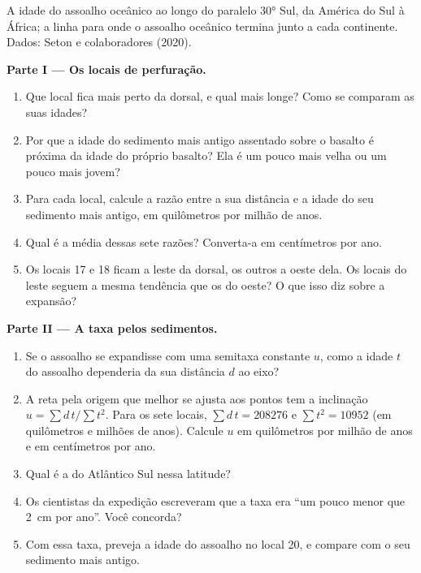 \begin{problem}
\begin{center}
{\small A idade do assoalho oceânico ao longo do paralelo \ang{30} Sul, da
América do Sul à África; a linha para onde o assoalho oceânico termina junto
a cada continente. Dados: Seton e colaboradores (2020).}
\end{center}

\medskip
\noindent\textbf{Parte I --- Os locais de perfuração.}
\begin{enumerate}
  \item Que local fica mais perto da dorsal, e qual mais longe? Como se
        comparam as suas idades?
  \item Por que a idade do sedimento mais antigo assentado sobre o basalto é
        próxima da idade do próprio basalto? Ela é um pouco mais velha ou um
        pouco mais jovem?
  \item Para cada local, calcule a razão entre a sua distância e a idade do
        seu sedimento mais antigo, em quilômetros por milhão de anos.
  \item Qual é a média dessas sete razões? Converta-a em centímetros por
        ano.
  \item Os locais 17 e 18 ficam a leste da dorsal, os outros a oeste dela. Os
        locais do leste seguem a mesma tendência que os do oeste? O que isso
        diz sobre a expansão?
\end{enumerate}

\medskip
\noindent\textbf{Parte II --- A taxa pelos sedimentos.}
\begin{enumerate}[resume]
  \item Se o assoalho se expandisse com uma semitaxa constante $u$, como a
        idade $t$ do assoalho dependeria da sua distância $d$ ao eixo?
  \item A reta pela origem que melhor se ajusta aos pontos tem a inclinação
        $u = \sum d\,t / \sum t^2$. Para os sete locais,
        $\sum d\,t = \num{208276}$ e $\sum t^2 = \num{10952}$ (em
        quilômetros e milhões de anos). Calcule $u$ em quilômetros por
        milhão de anos e em centímetros por ano.
  \item Qual é a  do Atlântico Sul nessa latitude?
  \item Os cientistas da expedição escreveram que a taxa era ``um pouco
        menor que \qty{2}{cm} por ano''. Você concorda?
  \item Com essa taxa, preveja a idade do assoalho no local 20, e compare com
        o seu sedimento mais antigo.
\end{enumerate}


\end{problem}
